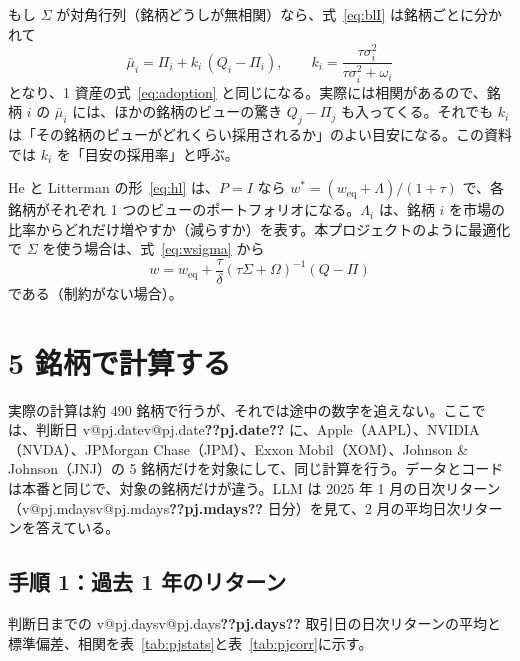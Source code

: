 \documentclass[xelatex,ja=standard,jafont=hiragino-pron,a4paper,11pt,openany]{bxjsreport}
\makeatletter
\newcommand{\V}[1]{\ifcsname v@#1\endcsname\csname v@#1\endcsname\else\textbf{??#1??}\fi}
\newcommand{\tabin}[1]{\adjustbox{max width=\linewidth}{}}
\newcommand{\weq}{w_{\mathrm{eq}}}
\newcommand{\mub}{\bar{\mu}}
\newcommand{\tabref}[1]{表~\ref{#1}}
\makeatother
\begin{document}
もし $\Sigma$ が対角行列（銘柄どうしが無相関）なら、式~\eqref{eq:blI} は銘柄ごとに分かれて
\begin{equation}
\mub_i = \Pi_i + k_i\,(Q_i - \Pi_i),\qquad k_i = \frac{\tau\sigma_i^2}{\tau\sigma_i^2 + \omega_i}
\label{eq:ki}
\end{equation}
となり、1 資産の式~\eqref{eq:adoption} と同じになる。実際には相関があるので、銘柄 $i$ の $\mub_i$ には、ほかの銘柄のビューの驚き $Q_j - \Pi_j$ も入ってくる。それでも $k_i$ は「その銘柄のビューがどれくらい採用されるか」のよい目安になる。この資料では $k_i$ を「目安の採用率」と呼ぶ。

He と Litterman の形~\eqref{eq:hl} は、$P = I$ なら $w^* = (\weq + \Lambda)/(1 + \tau)$ で、各銘柄がそれぞれ 1 つのビューのポートフォリオになる。$\Lambda_i$ は、銘柄 $i$ を市場の比率からどれだけ増やすか（減らすか）を表す。本プロジェクトのように最適化で $\Sigma$ を使う場合は、式~\eqref{eq:wsigma} から
\begin{equation}
w = \weq + \frac{\tau}{\delta}\left(\tau\Sigma + \Omega\right)^{-1}(Q - \Pi)
\label{eq:wsigmaI}
\end{equation}
である（制約がない場合）。

\section{5 銘柄で計算する}\label{sec:five}

実際の計算は約 490 銘柄で行うが、それでは途中の数字を追えない。ここでは、判断日 \V{pj.date} に、Apple（AAPL）、NVIDIA（NVDA）、JPMorgan Chase（JPM）、Exxon Mobil（XOM）、Johnson \& Johnson（JNJ）の 5 銘柄だけを対象にして、同じ計算を行う。データとコードは本番と同じで、対象の銘柄だけが違う。LLM は 2025 年 1 月の日次リターン（\V{pj.mdays} 日分）を見て、2 月の平均日次リターンを答えている。

\subsection{手順 1：過去 1 年のリターン}

判断日までの \V{pj.days} 取引日の日次リターンの平均と標準偏差、相関を\tabref{tab:pjstats}と\tabref{tab:pjcorr}に示す。

\begin{table}[htbp]
\centering
\caption{5 銘柄の過去 \V{pj.days} 取引日の日次リターン。年率は平均を 252 倍、標準偏差を $\sqrt{252}$ 倍したもの。}
\label{tab:pjstats}
\small\tabin{pj_stats}
\end{table}
\end{document}
